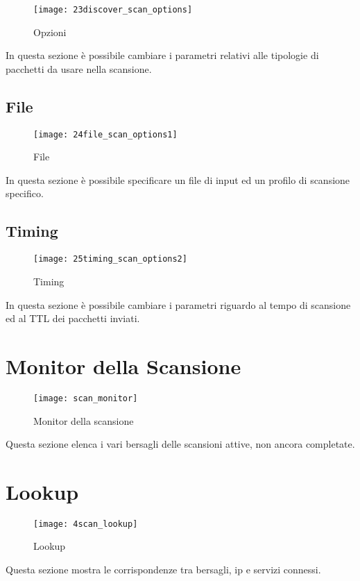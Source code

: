 \begin{figure}[h]
  \centering
  \texttt{[image: 23discover\_scan\_options]}
  \caption{Opzioni}
  \label{fig:ScanDiscover}
\end{figure}
In questa sezione \`e possibile cambiare i parametri relativi alle tipologie di 
pacchetti da usare nella scansione.

\subsection{File}
\label{sec:ScanFile}

\begin{figure}[h]
  \centering
  \texttt{[image: 24file\_scan\_options1]}
  \caption{File}
  \label{fig:ScanFile}
\end{figure}
In questa sezione \`e possibile specificare un file di input ed un profilo 
di scansione specifico.

\subsection{Timing}
\label{sec:ScanTiming}

\begin{figure}[h]
  \centering
  \texttt{[image: 25timing\_scan\_options2]}
  \caption{Timing}
  \label{fig:ScanTiming}
\end{figure}
In questa sezione \`e possibile cambiare i parametri riguardo al tempo di 
scansione ed al TTL dei pacchetti inviati.

\section{Monitor della Scansione}
\label{sec:ScanMonitor}

\begin{figure}[h]
  \centering
  \texttt{[image: scan\_monitor]}
  \caption{Monitor della scansione}
  \label{fig:ScanMonitor}
\end{figure}
Questa sezione elenca i vari bersagli delle scansioni attive, non ancora 
completate.

\section{Lookup}
\label{sec:Lookup}

\begin{figure}[h]
  \centering
  \texttt{[image: 4scan\_lookup]}
  \caption{Lookup}
  \label{fig:Lookup}
\end{figure}
Questa sezione mostra le corrispondenze tra bersagli, ip e servizi connessi.

